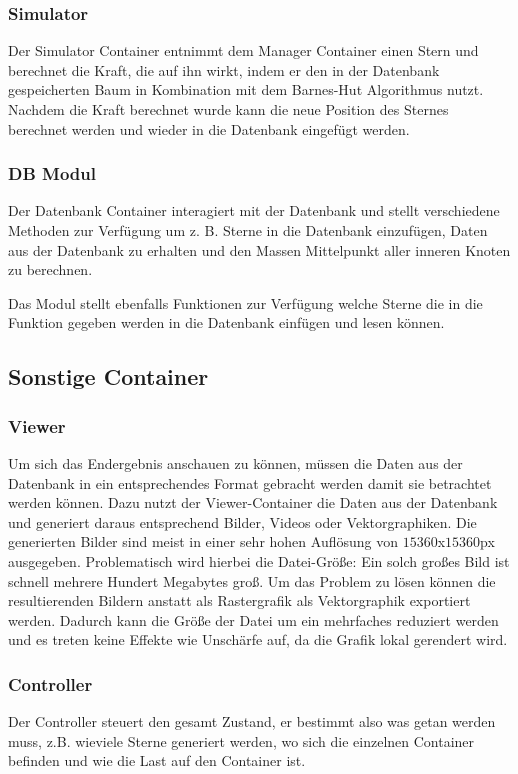 \subsubsection{Simulator}
Der Simulator Container entnimmt dem Manager Container einen Stern und
berechnet die Kraft, die auf ihn wirkt, indem er den in der Datenbank
gespeicherten Baum in Kombination mit dem Barnes-Hut Algorithmus nutzt. Nachdem die
Kraft berechnet wurde kann die neue Position des Sternes berechnet werden und
wieder in die Datenbank eingefügt werden.

\subsubsection{DB Modul} \label{subsubsec:db_modul}
Der Datenbank Container interagiert mit der Datenbank und stellt verschiedene
Methoden zur Verfügung um z. B. Sterne in die Datenbank einzufügen, Daten aus
der Datenbank zu erhalten und den Massen Mittelpunkt aller inneren Knoten zu
berechnen.

\par Das Modul stellt ebenfalls Funktionen zur Verfügung welche Sterne die in
die Funktion gegeben werden in die Datenbank einfügen und lesen können.

\subsection{Sonstige Container}

\subsubsection{Viewer}
Um sich das Endergebnis anschauen zu können, müssen die Daten aus der Datenbank
in ein entsprechendes Format gebracht werden damit sie betrachtet werden
können. Dazu nutzt der Viewer-Container die Daten aus der Datenbank und
generiert daraus entsprechend Bilder, Videos oder Vektorgraphiken. Die
generierten Bilder sind meist in einer sehr hohen Auflösung von
\(15360\)x\(15360\)px ausgegeben. Problematisch wird hierbei die Datei-Größe:
Ein solch großes Bild ist schnell mehrere Hundert Megabytes groß. Um das
Problem zu lösen können die resultierenden Bildern anstatt als Rastergrafik als
Vektorgraphik exportiert werden. Dadurch kann die Größe der Datei um ein
mehrfaches reduziert werden und es treten keine Effekte wie Unschärfe auf, da
die Grafik lokal gerendert wird.

\subsubsection{Controller}
Der Controller steuert den gesamt Zustand, er bestimmt also was getan werden
muss, z.B. wieviele Sterne generiert werden, wo sich die einzelnen Container
befinden und wie die Last auf den Container ist.

